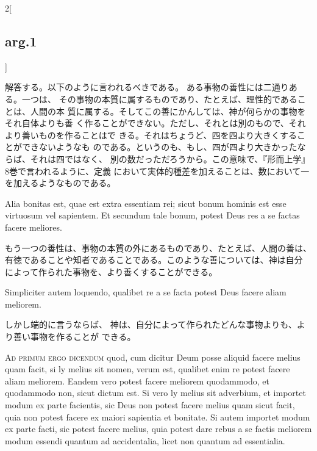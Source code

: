 \documentclass[paper=a4paper,fontsize=10pt,jafontsize=9pt,titlepage]{jlreq}
\begin{document}
\begin{paracol}{2}[\subsection{arg.1}]
\switchcolumn

解答する。以下のように言われるべきである。
ある事物の善性には二通りある。一つは、
その事物の本質に属するものであり、たとえば、理性的であることは、人間の本
質に属する。そしてこの善にかんしては、神が何らかの事物をそれ自体よりも善
く作ることができない。ただし、それとは別のもので、それより善いものを作ることはで
きる。それはちょうど、四を四より大きくすることができないようなも
のである。というのも、もし、四が四より大きかったならば、それは四ではなく、
別の数だっただろうから。この意味で、『形而上学』8巻で言われるように、定義
において実体的種差を加えることは、数において一を加えるようなものである。

\switchcolumn*

Alia bonitas est, quae est extra essentiam rei; sicut bonum
hominis est esse virtuosum vel sapientem. Et secundum tale bonum, potest
Deus res a se factas facere meliores.

\switchcolumn

もう一つの善性は、事物の本質の外にあるものであり、たとえば、人間の善は、
 有徳であることや知者であることである。このような善については、神は自分
 によって作られた事物を、より善くすることができる。

\switchcolumn*

Simpliciter autem loquendo,
qualibet re a se facta potest Deus facere aliam meliorem.

\switchcolumn

しかし端的に言うならば、
神は、自分によって作られたどんな事物よりも、より善い事物を作ることが
 できる。

\switchcolumn*[\subsection{ad.1}]

{\scshape Ad primum ergo dicendum} quod, cum dicitur
Deum posse aliquid facere melius quam facit, si ly melius sit nomen,
verum est, qualibet enim re potest facere aliam meliorem. Eandem vero
potest facere meliorem quodammodo, et quodammodo non, sicut dictum
est. Si vero ly melius sit adverbium, et importet modum ex parte
facientis, sic Deus non potest facere melius quam sicut facit, quia non
potest facere ex maiori sapientia et bonitate. Si autem importet modum
ex parte facti, sic potest facere melius, quia potest dare rebus a se
factis meliorem modum essendi quantum ad accidentalia, licet non quantum
ad essentialia.

\switchcolumn


\end{paracol}
\end{document}
